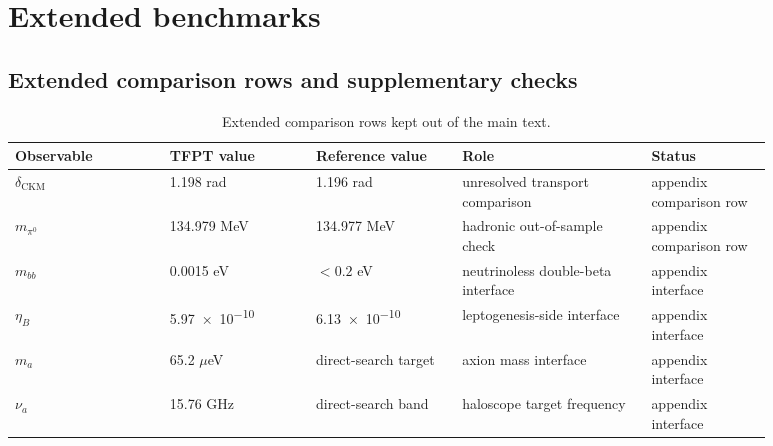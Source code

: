 \section{Extended benchmarks}
\label{app:benchmarks}

\subsection{Extended comparison rows and supplementary checks}

\begin{table}[H]
\centering
\scriptsize
\begin{tabularx}{\linewidth}{@{}>{\raggedright\arraybackslash}p{0.18\linewidth}>{\raggedleft\arraybackslash}p{0.17\linewidth}>{\raggedleft\arraybackslash}p{0.17\linewidth}>{\raggedright\arraybackslash}p{0.22\linewidth}>{\raggedright\arraybackslash}p{0.14\linewidth}@{}}
\toprule
Observable & TFPT value & Reference value & Role & Status \\
\midrule
$\delta_{\mathrm{CKM}}$ & \num{1.198} rad & \num{1.196} rad & unresolved transport comparison & appendix comparison row \\
$m_{\pi^0}$ & \num{134.979} MeV & \num{134.977} MeV & hadronic out-of-sample check & appendix comparison row \\
$m_{bb}$ & \num{0.0015} eV & $< \num{0.2}$ eV & neutrinoless double-beta interface & appendix interface \\
$\eta_B$ & \num{5.97e-10} & \num{6.13e-10} & leptogenesis-side interface & appendix interface \\
$m_a$ & \num{65.2} $\mu$eV & direct-search target & axion mass interface & appendix interface \\
$\nu_a$ & \num{15.76} GHz & direct-search band & haloscope target frequency & appendix interface \\
\bottomrule
\end{tabularx}
\caption{Extended comparison rows kept out of the main text.}
\label{tab:extended-benchmarks}
\end{table}


